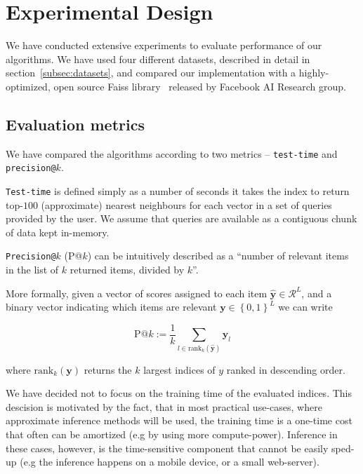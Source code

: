 \section{Experimental Design}\label{sec:experimentalDesign}

    We have conducted extensive experiments to evaluate performance of our algorithms. We have used
    four different datasets, described in detail in section~\ref{subsec:datasets}, and compared
    our implementation with a highly-optimized, open source Faiss library~\cite{faiss} released by
    Facebook AI Research group.

    \subsection{Evaluation metrics}\label{subsec:evaluationMetrics}

        We have compared the algorithms according to two metrics -- \texttt{test-time}
        and \texttt{precision@}$k$.

        \texttt{Test-time} is defined simply as a number of seconds it takes the index to return
        top-$100$ (approximate) nearest neighbours for each vector in a set of queries provided by the user.
        We assume that queries are available as a contiguous chunk of data kept in-memory.

        \texttt{Precision@}$k$ (P@$k$) can be intuitively described as a
        ``number of relevant items in the list of $k$ returned items, divided by $k$''.

        More formally, given a vector of scores assigned to each item $\hat{\mathbf y} \in {\mathcal{R}}^{L}$, and a
        binary vector indicating which items are relevant $\mathbf y \in \left\lbrace 0, 1 \right\rbrace^L$
        we can write

        \begin{equation*}
            \text{P}@k := \frac{1}{k} \sum_{l\in \text{rank}_k (\hat{\mathbf y})} \mathbf y_l
        \end{equation*}

        where $\text{rank}_k(\mathbf y)$ returns the $k$ largest indices of $y$ ranked in descending order.

        We have decided not to focus on the training time of the evaluated indices. This
        descision is motivated by the fact, that in most practical use-cases, where
        approximate inference methods will be used, the training time is a one-time cost that
        often can be amortized (e.g by using more compute-power).
        Inference in these cases, however, is the time-sensitive component
        that cannot be easily sped-up (e.g the inference happens on a mobile device, or a small web-server).

